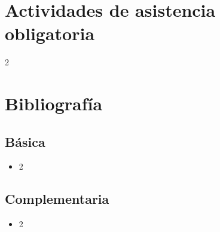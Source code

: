 \documentclass[11pt]{article}
\begin{document}
\section*{Actividades de asistencia obligatoria}

2

\section*{Bibliografía}

\subsection*{Básica}

\begin{itemize}
\item 2 
\end{itemize}

\subsection*{Complementaria}

\begin{itemize}
\item 2 
\end{itemize}
\end{document}
